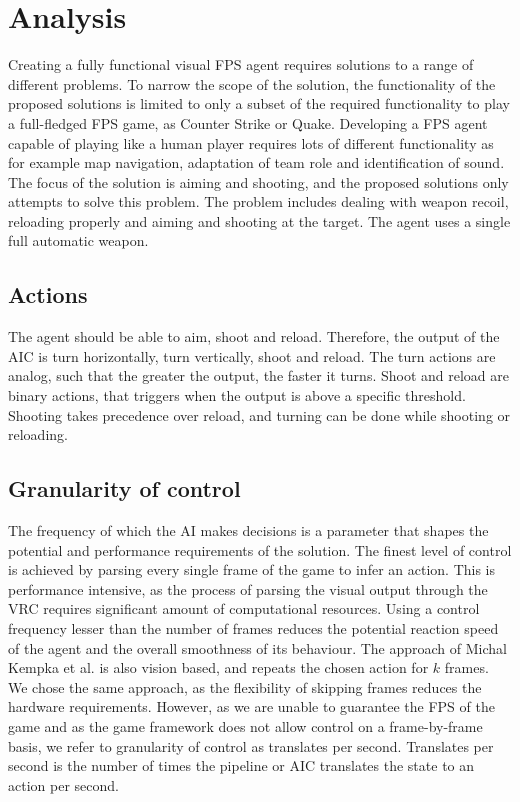 
\section{Analysis}
\label{sec:solutions}
Creating a fully functional visual FPS agent requires solutions to a range of different problems. To narrow the scope of the solution, the functionality of the proposed solutions is limited to only a subset of the required functionality to play a full-fledged FPS game, as Counter Strike or Quake. Developing a FPS agent capable of playing like a human player requires lots of different functionality as for example map navigation, adaptation of team role and identification of sound. The focus of the solution is aiming and shooting, and the proposed solutions only attempts to solve this problem. The problem includes dealing with weapon recoil, reloading properly and aiming and shooting at the target. The agent uses a single full automatic weapon.

\subsection{Actions}
The agent should be able to aim, shoot and reload. Therefore, the output of the AIC is turn horizontally, turn vertically, shoot and reload. The turn actions are analog, such that the greater the output, the faster it turns. Shoot and reload are binary actions, that triggers when the output is above a specific threshold. Shooting takes precedence over reload, and turning can be done while shooting or reloading.

\subsection{Granularity of control}
The frequency of which the AI makes decisions is a parameter that shapes the potential and performance requirements of the solution. The finest level of control is achieved by parsing every single frame of the game to infer an action. This is performance intensive, as the process of parsing the visual output through the VRC requires significant amount of computational resources. Using a control frequency lesser than the number of frames reduces the potential reaction speed of the agent and the overall smoothness of its behaviour. The approach of Michal Kempka et al.\cite{vizdoom} is also vision based, and repeats the chosen action for $k$ frames. We chose the same approach, as the flexibility of skipping frames reduces the hardware requirements. However, as we are unable to guarantee the FPS of the game and as the game framework does not allow control on a frame-by-frame basis, we refer to granularity of control as translates per second. Translates per second is the number of times the pipeline or AIC translates the state to an action per second.

